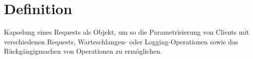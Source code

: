 \section{Definition}
\glqq Kapselung eines Requests als Objekt, um so die Parametrisierung von Clients mit verschiedenen Requests, Warteschlangen- oder Logging-Operationen sowie das Rückgängigmachen von Operationen zu ermöglichen.\grqq